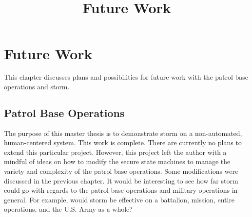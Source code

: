 \documentclass[../../main/main.tex]{subfiles}
\begin{document}
\title{Future Work}
\chapter{Future Work}\label{chp:future}

This chapter discusses plans and possibilities for future work with the patrol base operations and \gls{storm}.


\section{Patrol Base Operations}\label{sec:futureops}
The purpose of this master thesis is to demonstrate \gls{storm} on a non-automated, human-centered system.  This work is complete.  There are currently no plans to extend this particular project.  However, this project left the author with a mindful of ideas on how to modify the secure state machines to manage the variety and complexity of the patrol base operations.   Some modifications were discussed in the previous chapter.  It would be interesting to see how far \gls{storm} could go with regards to the patrol base operations and military operations in general.  For example, would \gls{storm} be effective on a battalion, mission, entire operations, and the U.S. Army as  a whole?


%
%
\end{document}
